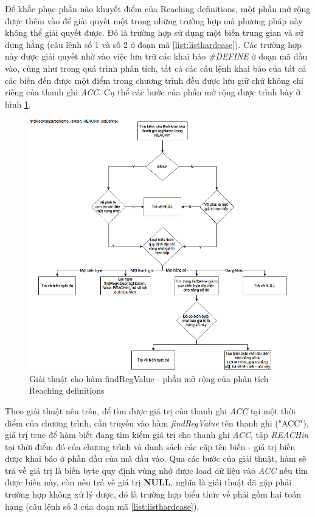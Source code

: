 Để khắc phục phần nào khuyết điểm của Reaching definitions, một phần mở rộng được thêm vào để giải quyết một trong những trường hợp mà phương pháp này không thể giải quyết được. Đó là trường hợp sử dụng một biến trung gian và sử dụng hằng (câu lệnh số 1 và số 2 ở đoạn mã \ref{list:listhardcase}). Các trường hợp này được giải quyết nhờ vào việc lưu trữ các khai báo \textit{\#DEFINE} ở đoạn mã đầu vào, cũng như trong quá trình phân tích, tất cả các câu lệnh khai báo của tất cả các biến đến được một điểm trong chương trình đều được lưu giữ chứ không chỉ riêng của thanh ghi \textit{ACC}. Cụ thể các bước của phần mở rộng được trình bày ở hình \ref{fig:reachdefextendalgo}.
\begin{figure}
	\centering
	\includegraphics[width=0.7\linewidth]{image/reachdefextendalgo}
	\caption{Giải thuật cho hàm findRegValue - phần mở rộng của phân tích Reaching definitions}
	\label{fig:reachdefextendalgo}
\end{figure}

Theo giải thuật nêu trên, để tìm được giá trị của thanh ghi \textit{ACC} tại một thời điểm của chương trình, cần truyền vào hàm \textit{findRegValue} tên thanh ghi ("ACC"), giá trị true để hàm biết đang tìm kiếm giá trị cho thanh ghi \textit{ACC}, tập \textit{REACHin} tại thời điểm đó của chương trình và danh sách các cặp tên biến - giá trị biến được khai báo ở phần đầu của mã đầu vào. Qua các bước của giải thuật, hàm sẽ trả về giá trị là biến byte quy định vùng nhớ được load dữ liệu vào \textit{ACC} nếu tìm được biến này, còn nếu trả về giá trị \textbf{NULL}, nghĩa là giải thuật đã gặp phải trường hợp không xử lý được, đó là trường hợp biểu thức vế phải gồm hai toán hạng (câu lệnh số 3 của đoạn mã \ref{list:listhardcase}).

